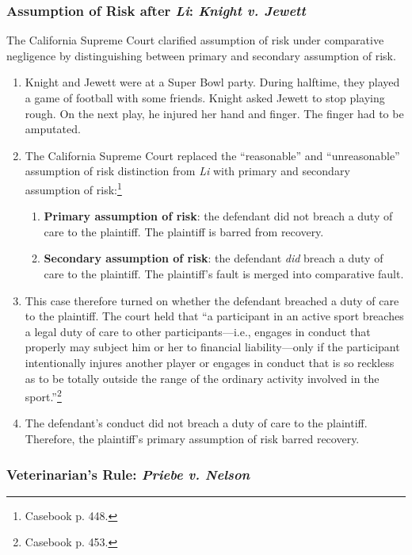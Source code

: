 \subsubsection{Assumption of Risk after \emph{Li}: \emph{Knight v. Jewett}}

The California Supreme Court clarified assumption of risk under comparative 
negligence by distinguishing between primary and secondary assumption of risk.

\begin{enumerate}
    \item Knight and Jewett were at a Super Bowl party. During halftime, they 
    played a game of football with some friends. Knight asked Jewett to stop 
    playing rough. On the next play, he injured her hand and finger. The 
    finger had to be amputated.
    \item The California Supreme Court replaced the ``reasonable'' and 
    ``unreasonable'' assumption of risk distinction from \emph{Li} with 
    primary and secondary assumption of risk:\footnote{Casebook p. 448.}
    \begin{enumerate}
        \item \textbf{Primary assumption of risk}: the defendant did not 
        breach a duty of care to the plaintiff. The plaintiff is barred from 
        recovery.
        \item \textbf{Secondary assumption of risk}: the defendant \emph{did} 
        breach a duty of care to the plaintiff. The plaintiff's fault is 
        merged into comparative fault.
    \end{enumerate}
    \item This case therefore turned on whether the defendant breached a duty 
    of care to the plaintiff. The court held that ``a participant in an active 
    sport breaches a legal duty of care to other participants---i.e., engages 
    in conduct that properly may subject him or her to financial 
    liability---only if the participant intentionally injures another player 
    or engages in conduct that is so reckless as to be totally outside the 
    range of the ordinary activity involved in the sport.''\footnote{Casebook 
    p. 453.}
    \item The defendant's conduct did not breach a duty of care to the 
    plaintiff. Therefore, the plaintiff's primary assumption of risk barred 
    recovery.
\end{enumerate}

\subsubsection{Veterinarian's Rule: \emph{Priebe v. Nelson}}

